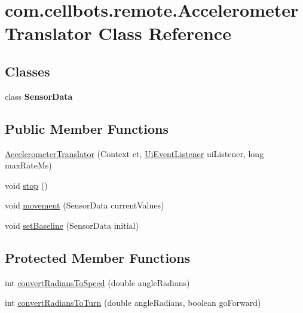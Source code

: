 \hypertarget{classcom_1_1cellbots_1_1remote_1_1_accelerometer_translator}{\section{com.\-cellbots.\-remote.\-Accelerometer\-Translator Class Reference}
\label{classcom_1_1cellbots_1_1remote_1_1_accelerometer_translator}
}
\subsection*{Classes}
\begin{DoxyCompactItemize}
\item 
class {\bfseries Sensor\-Data}
\end{DoxyCompactItemize}
\subsection*{Public Member Functions}
\begin{DoxyCompactItemize}
\item 
\hyperlink{classcom_1_1cellbots_1_1remote_1_1_accelerometer_translator_a4f5c735bdf53b25e77b3a2d9fff0cc62}{Accelerometer\-Translator} (Context ct, \hyperlink{interfacecom_1_1cellbots_1_1remote_1_1_ui_view_1_1_ui_event_listener}{Ui\-Event\-Listener} ui\-Listener, long max\-Rate\-Ms)
\item 
void \hyperlink{classcom_1_1cellbots_1_1remote_1_1_accelerometer_translator_a83312a865f4355979f035994bca9871b}{stop} ()
\item 
void \hyperlink{classcom_1_1cellbots_1_1remote_1_1_accelerometer_translator_a8df167847090a980b9241b2742f6bc3b}{movement} (Sensor\-Data current\-Values)
\item 
void \hyperlink{classcom_1_1cellbots_1_1remote_1_1_accelerometer_translator_a6d9cccb57457ca1d65810ebc4e11762d}{set\-Baseline} (Sensor\-Data initial)
\end{DoxyCompactItemize}
\subsection*{Protected Member Functions}
\begin{DoxyCompactItemize}
\item 
int \hyperlink{classcom_1_1cellbots_1_1remote_1_1_accelerometer_translator_a1bde37552a9cb4a67e84162ea171dab0}{convert\-Radians\-To\-Speed} (double angle\-Radians)
\item 
int \hyperlink{classcom_1_1cellbots_1_1remote_1_1_accelerometer_translator_a65a9273b907c6927bb585533054ae71c}{convert\-Radians\-To\-Turn} (double angle\-Radians, boolean go\-Forward)
\end{DoxyCompactItemize}


